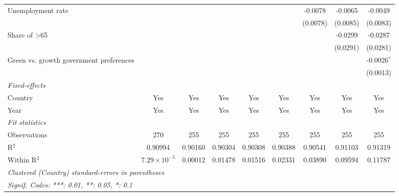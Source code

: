 \begin{table}[htbp]
\begin{tabular}{lcccccccc}
      Unemployment rate                                           &                       &          &          &          &          & -0.0078  & -0.0065  & -0.0049\\   
                                                                  &                       &          &          &          &          & (0.0078) & (0.0085) & (0.0083)\\   
      Share of >65                                                &                       &          &          &          &          &          & -0.0299  & -0.0287\\   
                                                                  &                       &          &          &          &          &          & (0.0291) & (0.0281)\\   
      Green vs. growth government preferences                     &                       &          &          &          &          &          &          & -0.0026$^{*}$\\   
                                                                  &                       &          &          &          &          &          &          & (0.0013)\\   
      \midrule
      \emph{Fixed-effects}\\
      Country                                                     & Yes                   & Yes      & Yes      & Yes      & Yes      & Yes      & Yes      & Yes\\  
      Year                                                        & Yes                   & Yes      & Yes      & Yes      & Yes      & Yes      & Yes      & Yes\\  
      \midrule
      \emph{Fit statistics}\\
      Observations                                                & 270                   & 255      & 255      & 255      & 255      & 255      & 255      & 255\\  
      R$^2$                                                       & 0.90994               & 0.90160  & 0.90304  & 0.90308  & 0.90388  & 0.90541  & 0.91103  & 0.91319\\  
      Within R$^2$                                                & $7.29\times 10^{-5}$  & 0.00012  & 0.01478  & 0.01516  & 0.02331  & 0.03890  & 0.09594  & 0.11787\\  
      \midrule \midrule
      \multicolumn{9}{l}{\emph{Clustered (Country) standard-errors in parentheses}}\\
      \multicolumn{9}{l}{\emph{Signif. Codes: ***: 0.01, **: 0.05, *: 0.1}}\\
   \end{tabular}
\end{table}


